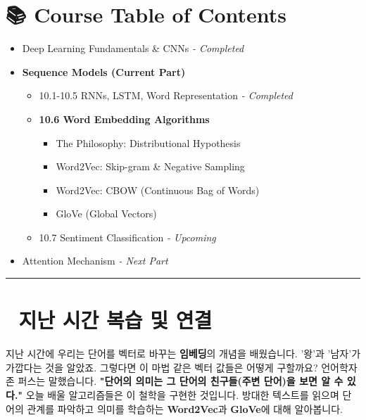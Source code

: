\documentclass[11pt,a4paper]{book}
\theoremstyle{definition}
\begin{document}
\section*{📚 Course Table of Contents}
\begin{itemize}
    \item[Chapter 1-9.] Deep Learning Fundamentals \& CNNs \textit{- Completed}
    \item[\textbf{Chapter 10.}] \textbf{Sequence Models (Current Part)}
    \begin{itemize}
        \item 10.1-10.5 RNNs, LSTM, Word Representation \textit{- Completed}
        \item \textbf{10.6 Word Embedding Algorithms}
        \begin{itemize}
            \item The Philosophy: Distributional Hypothesis
            \item Word2Vec: Skip-gram \& Negative Sampling
            \item Word2Vec: CBOW (Continuous Bag of Words)
            \item GloVe (Global Vectors)
        \end{itemize}
        \item 10.7 Sentiment Classification \textit{- Upcoming}
    \end{itemize}
    \item[Chapter 11.] Attention Mechanism \textit{- Next Part}
\end{itemize}

\vspace{0.5cm}
\hrule
\vspace{0.5cm}

\section*{🔗 지난 시간 복습 및 연결}
지난 시간에 우리는 단어를 벡터로 바꾸는 \textbf{임베딩}의 개념을 배웠습니다. '왕'과 '남자'가 가깝다는 것을 알았죠.
그렇다면 이 마법 같은 벡터 값들은 어떻게 구할까요? 언어학자 존 퍼스는 말했습니다.
\textbf{"단어의 의미는 그 단어의 친구들(주변 단어)을 보면 알 수 있다."}
오늘 배울 알고리즘들은 이 철학을 구현한 것입니다. 방대한 텍스트를 읽으며 단어의 관계를 파악하고 의미를 학습하는 \textbf{Word2Vec}과 \textbf{GloVe}에 대해 알아봅니다.

\end{document}
